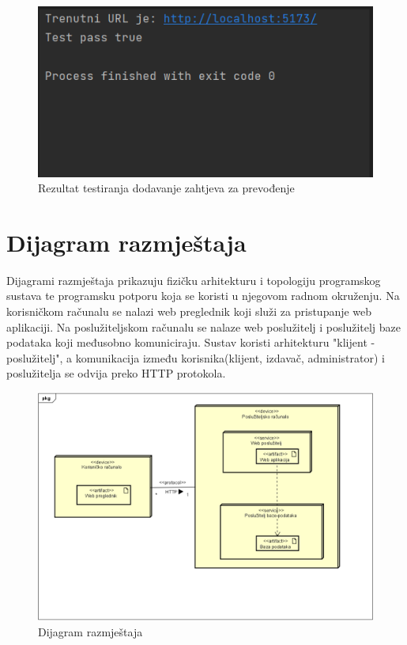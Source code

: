 			
			
			\begin{figure}[H]
				\includegraphics[width=\textwidth]{slike/SelTest4.PNG} %
				\centering
				\caption{Rezultat testiranja dodavanje zahtjeva za prevođenje}
				\label{fig:testTranslationRequest1}
			\end{figure}
			
			\eject
		
		
		
		\section{Dijagram razmještaja}
			
			Dijagrami razmještaja prikazuju fizičku arhitekturu i topologiju programskog sustava te programsku potporu koja se koristi u njegovom radnom okruženju. Na korisničkom računalu se nalazi web preglednik koji služi za pristupanje web aplikaciji. Na poslužiteljskom računalu se nalaze web poslužitelj i poslužitelj baze podataka koji međusobno komuniciraju. Sustav koristi arhitekturu "klijent - poslužitelj", a komunikacija između korisnika(klijent, izdavač, administrator) i poslužitelja se odvija preko HTTP protokola.
			
			\begin{figure}[H]
				\includegraphics[width=\textwidth]{dijagrami/DijagramRazmjestaja.PNG} %
				\centering
				\caption{Dijagram razmještaja}
				\label{fig:diagrazmjestaja}
			\end{figure}
			
